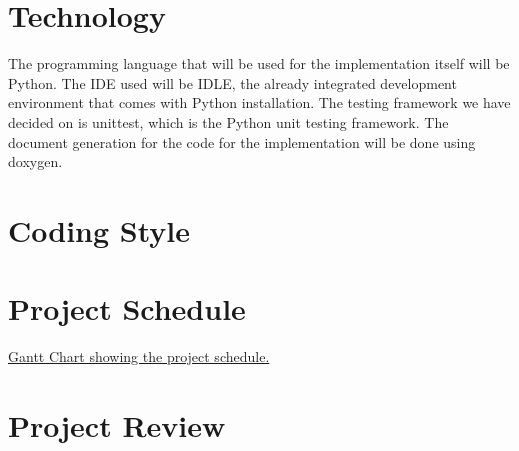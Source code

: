\documentclass[12pt]{article}
\begin{document}
\section{Technology}

\tab The programming language that will be used for the implementation itself will be Python. The IDE used will be IDLE, the already integrated development environment that comes with Python installation. The testing framework we have decided on is unittest, which is the Python unit testing framework. The document generation for the code for the implementation will be done using doxygen. 

\section{Coding Style}

\section{Project Schedule}

   \href{3XA3 Gantt Chart.pdf}{Gantt Chart showing the project schedule.}

\section{Project Review}
\end{document}
